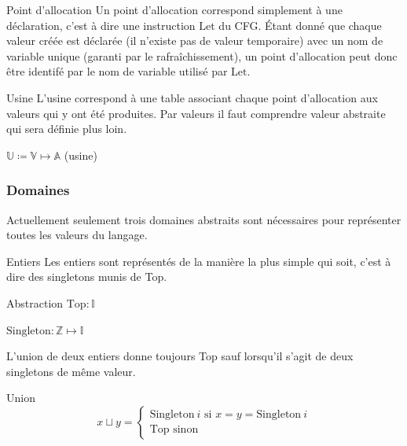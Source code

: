 \documentclass{beamer}
\begin{document}
\begin{frame}{Point d'allocation}
    Un point d'allocation correspond simplement à une déclaration, c'est à dire une instruction $\text{Let}$ du CFG. Étant donné que chaque valeur créée est déclarée (il n'existe pas de valeur temporaire) avec un nom de variable unique (garanti par le rafraîchissement), un point d'allocation peut donc être identifé par le nom de variable utilisé par $\text{Let}$. 
\end{frame}

\begin{frame}{Usine}
    L'usine correspond à une table associant chaque point d'allocation aux valeurs qui y ont été produites. Par valeurs il faut comprendre valeur abstraite qui sera définie plus loin.

    $\mathbb{U} \coloneqq \mathbb{V} \mapsto \mathbb{A}$ (usine)
\end{frame}

\subsubsection{Domaines}

Actuellement seulement trois domaines abstraits sont nécessaires pour représenter toutes les valeurs du langage.

\begin{frame}{Entiers}
    Les entiers sont représentés de la manière la plus simple qui soit, c'est à dire des singletons munis de Top.
    
    \begin{block}{Abstraction}
        $\text{Top} : \mathbb{I}$

        $\text{Singleton} : \mathbb{Z} \mapsto \mathbb{I}$
    \end{block}

    L'union de deux entiers donne toujours Top sauf lorsqu'il s'agit de deux singletons de même valeur.

    \begin{block}{Union}
        $$
        x \sqcup y =
        \begin{cases}
            \text{Singleton} ~ i \text{ si } x = y = \text{Singleton} ~ i  \\
            \text{Top} \text{ sinon}
        \end{cases}
        $$
    \end{block}
\end{frame}
\end{document}
